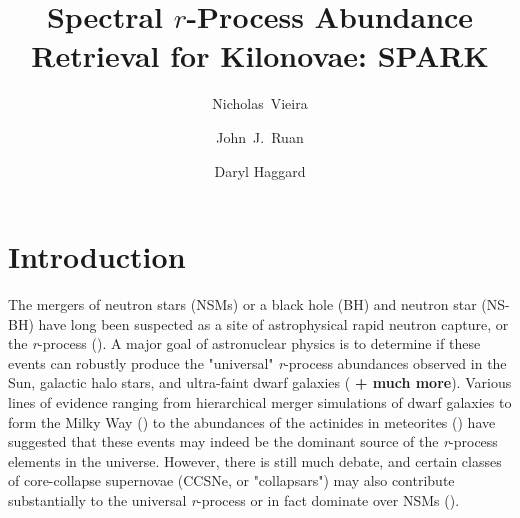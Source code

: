 \documentclass[twocolumn]{aastex63}
\begin{document}
\title{Spectral $r$-Process Abundance Retrieval for Kilonovae: \textsc{SPARK}}


\author[0000-0001-7815-7604]{Nicholas~Vieira}

\author[0000-0001-8665-5523]{John~J.~Ruan}

\author[0000-0001-6803-2138]{Daryl Haggard}


\begin{abstract}
\end{abstract}


\section{Introduction}\label{sec:intro}
The mergers of neutron stars (NSMs) or a black hole (BH) and neutron star (NS-BH) have long been suspected as a site of astrophysical rapid neutron capture, or the \textit{r}-process (\citealt{lattimer74, eichler89, freiburghaus99}). A major goal of astronuclear physics is to determine if these events can robustly produce the "universal" \textit{r}-process abundances observed in the Sun, galactic halo stars, and ultra-faint dwarf galaxies (\citealt{ji16, cote18} \textbf{+ much more}). Various lines of evidence ranging from hierarchical merger simulations of dwarf galaxies to form the Milky Way (\citealt{ishimaru15}) to the abundances of the actinides in meteorites (\citealt{bartos19}) have suggested that these events may indeed be the dominant source of the \textit{r}-process elements in the universe. However, there is still much debate, and certain classes of core-collapse supernovae (CCSNe, or "collapsars") may also contribute substantially to the universal \textit{r}-process or in fact dominate over NSMs (\citealt{siegel19}).
\end{document}
